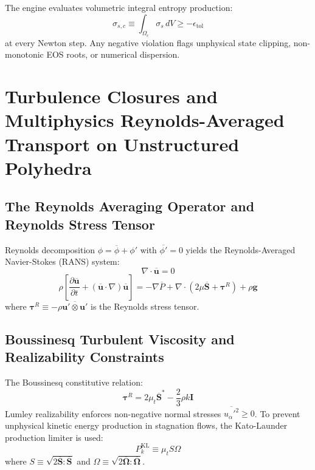 \documentclass[11pt,a4paper]{article}
\begin{document}
The engine evaluates volumetric integral entropy production:
\begin{equation}
\sigma_{s, c} \equiv \int_{\Omega_c} \sigma_s \, dV \ge -\epsilon_{\text{tol}}
\end{equation}
at every Newton step. Any negative violation flags unphysical state clipping, non-monotonic EOS roots, or numerical dispersion.


\section{Turbulence Closures and Multiphysics Reynolds-Averaged Transport on Unstructured Polyhedra}
\label{sec:turbulence-closures}

\subsection{The Reynolds Averaging Operator and Reynolds Stress Tensor}
\label{subsec:rans-formulation}

Reynolds decomposition $\phi = \overline{\phi} + \phi'$ with $\overline{\phi'} = 0$ yields the Reynolds-Averaged Navier-Stokes (RANS) system:
\begin{equation}
\nabla \cdot \overline{\mathbf{u}} = 0
\end{equation}
\begin{equation}
\rho \left[ \frac{\partial \overline{\mathbf{u}}}{\partial t} + (\overline{\mathbf{u}} \cdot \nabla) \overline{\mathbf{u}} \right] = -\nabla \overline{P} + \nabla \cdot \left( 2 \mu \overline{\mathbf{S}} + \boldsymbol{\tau}^R \right) + \rho \mathbf{g}
\end{equation}
where $\boldsymbol{\tau}^R \equiv -\rho \overline{\mathbf{u}' \otimes \mathbf{u}'}$ is the Reynolds stress tensor.

\subsection{Boussinesq Turbulent Viscosity and Realizability Constraints}
\label{subsec:boussinesq-hypothesis}

The Boussinesq constitutive relation:
\begin{equation}
\boldsymbol{\tau}^R = 2 \mu_t \overline{\mathbf{S}}^* - \frac{2}{3} \rho k \mathbf{I}
\end{equation}
Lumley realizability enforces non-negative normal stresses $\overline{u_\alpha'^2} \ge 0$. To prevent unphysical kinetic energy production in stagnation flows, the Kato-Launder production limiter is used:
\begin{equation}
P_k^{\text{KL}} \equiv \mu_t S \Omega
\end{equation}
where $S \equiv \sqrt{2 \overline{\mathbf{S}} : \overline{\mathbf{S}}}$ and $\Omega \equiv \sqrt{2 \overline{\boldsymbol{\Omega}} : \overline{\boldsymbol{\Omega}}}$.
\end{document}
